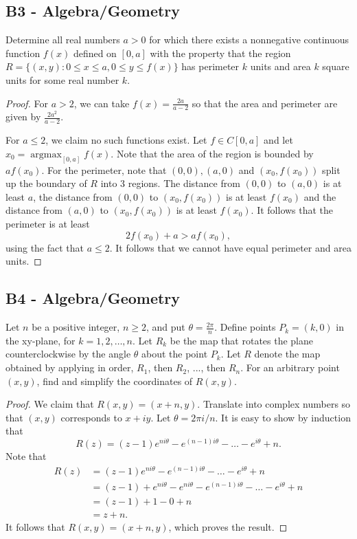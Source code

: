 \documentclass[11pt]{scrartcl}
\newcommand{\<}{\langle}
\renewcommand{\>}{\rangle}
\begin{document}
\subsection{B3 - Algebra/Geometry}
Determine all real numbers $a>0$ for which there exists a nonnegative continuous function $f(x)$ defined on $[0,a]$ with the property that the region
$R=\{(x,y): 0\le x\le a, 0\le y\le f(x)\}$
has perimeter $k$ units and area $k$ square units for some real number $k$.
\begin{proof}
For $a > 2$, we can take $f(x) = \frac{2a}{a-2}$ so that the area and perimeter are given by $\frac{2a^2}{a-2}$.

For $a \le 2$, we claim no such functions exist. Let $f \in C[0, a]$ and let $x_0 = \operatorname{argmax}_{[0, a]} f(x)$. Note that the area of the region is bounded by $af(x_0)$. For the perimeter, note that $(0, 0), (a, 0)$ and $(x_0, f(x_0))$ split up the boundary of $R$ into $3$ regions. The distance from $(0, 0)$ to $(a, 0)$ is at least $a$, the distance from $(0, 0)$ to $(x_0, f(x_0))$ is at least $f(x_0)$ and the distance from $(a, 0)$ to $(x_0, f(x_0))$ is at least $f(x_0)$. It follows that the perimeter is at least
$$2f(x_0) + a > af(x_0),$$using the fact that $a \le 2$. It follows that we cannot have equal perimeter and area units.
\end{proof}
\pagebreak
\subsection{B4 - Algebra/Geometry}
Let $n$ be a positive integer, $n \ge 2$, and put $\theta=\frac{2\pi}{n}$. Define points $P_k=(k,0)$ in the xy-plane, for $k=1,2,\dots,n$. Let $R_k$ be the map that rotates the plane counterclockwise by the angle $\theta$ about the point $P_k$. Let $R$ denote the map obtained by applying in order, $R_1$, then $R_2$, ..., then $R_n$. For an arbitrary point $(x,y)$, find and simplify the coordinates of $R(x,y)$.
\begin{proof}
We claim that $R(x, y) = (x + n, y)$.  Translate into complex numbers so that $(x, y)$ corresponds to $x + iy$.    Let $\theta = 2\pi i /n$.  It is easy to show by induction that 
$$R(z) = (z-1) e^{ni \theta} - e^{(n-1)i\theta} - \dots - e^{i\theta} + n.$$
Note that 
\begin{align*}
R(z) &= (z-1) e^{ni \theta} - e^{(n-1)i\theta} - \dots - e^{i\theta} + n \\
&= (z-1) + e^{ni\theta} - e^{ni\theta}- e^{(n-1)i\theta} - \dots - e^{i\theta} + n \\
&= (z - 1) + 1 - 0 + n \\
&= z + n.
\end{align*}
It follows that $R(x, y) = (x + n, y)$, which proves the result. 
\end{proof}
\pagebreak
\end{document}
